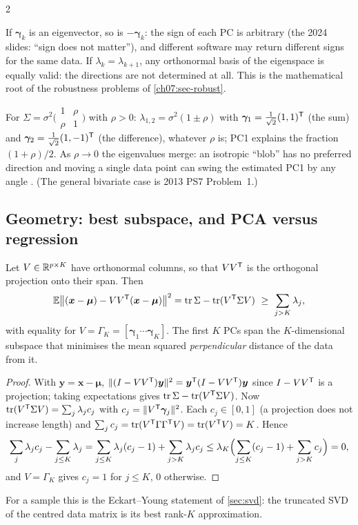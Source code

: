 \begin{paracol}{2}
\begin{remark}[Uniqueness]\label{ch07:rem-sign}
If $\bm\gamma_k$ is an eigenvector, so is $-\bm\gamma_k$: the sign of each PC is arbitrary (the 2024 slides:
``sign does not matter''), and different software may return different signs for the same data. If
$\lambda_k=\lambda_{k+1}$, any orthonormal basis of the eigenspace is equally valid: the directions are not
determined at all. This is the mathematical root of the robustness problems of \cref{ch07:sec-robust}.
\end{remark}

\begin{example}\label{ch07:ex-2d}
For $\Sigma=\sigma^2\bigl(\begin{smallmatrix}1&\rho\\ \rho&1\end{smallmatrix}\bigr)$ with $\rho>0$: $\lambda_{1,2}=\sigma^2(1\pm\rho)$ with
$\bm\gamma_1=\frac1{\sqrt2}(1,1)^{\mathsf T}$ (the sum) and $\bm\gamma_2=\frac1{\sqrt2}(1,-1)^{\mathsf T}$ (the difference), whatever $\rho$ is;
PC1 explains the fraction $(1+\rho)/2$. As $\rho\to0$ the eigenvalues merge: an isotropic ``blob'' has no
preferred direction and moving a single data point can swing the estimated PC1 by any angle
. (The general bivariate case is 2013 PS7 Problem~1.)
\end{example}

\subsection{Geometry: best subspace, and PCA versus regression}\label{ch07:sec-geom}

\begin{proposition}\label{ch07:prop-best}
Let $V\in\mathbb{R}^{p\times K}$ have orthonormal columns, so that $VV^{\mathsf T}$ is the orthogonal projection onto their span.
Then
\[
  \E\bigl\|(\bm x-\bm\mu)-VV\T(\bm x-\bm\mu)\bigr\|^2=\tr\Sigma-\tr(V\T\Sigma V)\ \ge\ \sum_{j>K}\lambda_j ,
\]
with equality for $V=\Gamma_K=[\bm\gamma_1\cdots\bm\gamma_K]$. The first $K$ PCs span the $K$-dimensional subspace that
minimises the mean squared \emph{perpendicular} distance of the data from it.
\end{proposition}
\begin{proof}
With $\bm y=\bm x-\bm\mu$, $\|(I-VV^{\mathsf T})\bm y\|^2=\bm y^{\mathsf T}(I-VV^{\mathsf T})\bm y$ since $I-VV^{\mathsf T}$ is a projection; taking expectations gives
$\operatorname{tr}\Sigma-\operatorname{tr}(V^{\mathsf T}\Sigma V)$. Now $\operatorname{tr}(V^{\mathsf T}\Sigma V)=\sum_j\lambda_jc_j$ with $c_j=\|V^{\mathsf T}\bm\gamma_j\|^2$. Each
$c_j\in[0,1]$ (a projection does not increase length) and $\sum_jc_j=\operatorname{tr}(V^{\mathsf T}\Gamma\Gamma^{\mathsf T} V)=\operatorname{tr}(V^{\mathsf T} V)=K$. Hence
\[
  \sum_j\lambda_jc_j-\sum_{j\le K}\lambda_j=\sum_{j\le K}\lambda_j(c_j-1)+\sum_{j>K}\lambda_jc_j
  \le\lambda_K\Bigl(\sum_{j\le K}(c_j-1)+\sum_{j>K}c_j\Bigr)=0,
\]
and $V=\Gamma_K$ gives $c_j=1$ for $j\le K$, $0$ otherwise.
\end{proof}
For a sample this is the Eckart--Young statement of \cref{sec:svd}: the truncated SVD of the centred data
matrix is its best rank-$K$ approximation.


\end{paracol}
